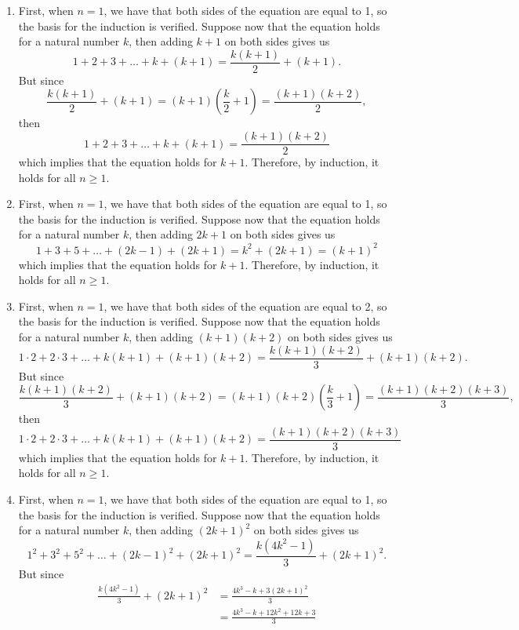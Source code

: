 \begin{solution}
    \begin{enumerate}
        \item First, when $n=1$, we have that both sides of the equation are equal to 1, so the basis for the induction is verified. Suppose now that the equation holds for a natural number $k$, then adding $k+1$ on both sides gives us
        $$1 + 2 + 3 + \dots + k + (k+1) = \frac{k(k+1)}{2} + (k+1).$$
        But since
        $$\frac{k(k+1)}{2} + (k+1) = (k+1)\left(\frac{k}{2} + 1\right) = \frac{(k+1)(k+2)}{2},$$
        then 
        $$1 + 2 + 3 + \dots + k + (k+1) = \frac{(k+1)(k+2)}{2}$$
        which implies that the equation holds for $k+1$. Therefore, by induction, it holds for all $n \geq 1$. 
        \item First, when $n=1$, we have that both sides of the equation are equal to 1, so the basis for the induction is verified. Suppose now that the equation holds for a natural number $k$, then adding $2k+1$ on both sides gives us
        $$1 + 3 + 5 + \dots + (2k-1) + (2k+1) = k^2 + (2k+1) = (k+1)^2$$
        which implies that the equation holds for $k+1$. Therefore, by induction, it holds for all $n \geq 1$. 
        \item First, when $n=1$, we have that both sides of the equation are equal to 2, so the basis for the induction is verified. Suppose now that the equation holds for a natural number $k$, then adding $(k+1)(k+2)$ on both sides gives us
        $$1\cdot 2 + 2\cdot 3 + \dots + k(k+1) + (k+1)(k+2) = \frac{k(k+1)(k+2)}{3} + (k+1)(k+2).$$
        But since
        $$\frac{k(k+1)(k+2)}{3} + (k+1)(k+2) = (k+1)(k+2)\left(\frac{k}{3} + 1\right) = \frac{(k+1)(k+2)(k+3)}{3},$$
        then 
        $$1\cdot 2 + 2\cdot 3 + \dots + k(k+1) + (k+1)(k+2) = \frac{(k+1)(k+2)(k+3)}{3}$$
        which implies that the equation holds for $k+1$. Therefore, by induction, it holds for all $n \geq 1$. 
        \item First, when $n=1$, we have that both sides of the equation are equal to 1, so the basis for the induction is verified. Suppose now that the equation holds for a natural number $k$, then adding $(2k+1)^2$ on both sides gives us
        $$1^2 + 3^2 + 5^2 + \dots + (2k-1)^2 + (2k+1)^2 = \frac{k(4k^2 - 1)}{3} + (2k+1)^2.$$
        But since
        \begin{align*}
        \frac{k(4k^2 - 1)}{3} + (2k+1)^2 &= \frac{4k^3 - k + 3(2k+1)^2}{3} \\
        &= \frac{4k^3 - k + 12k^2 + 12k + 3}{3} \\

\end{align*}
\end{enumerate}
\end{solution}
